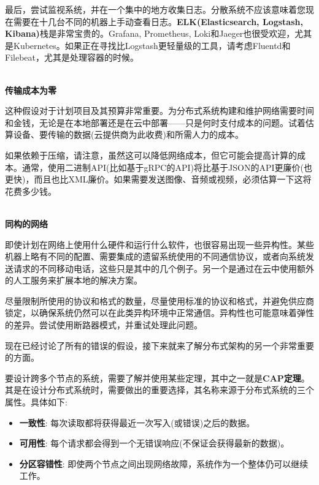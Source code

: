 最后，尝试监视系统，并在一个集中的地方收集日志。分散系统不应该意味着您现在需要在十几台不同的机器上手动查看日志。\textbf{ELK(Elasticsearch, Logstash, Kibana)}栈是非常宝贵的。Grafana, Prometheus, Loki和Jaeger也很受欢迎，尤其是Kubernetes。如果正在寻找比Logstash更轻量级的工具，请考虑Fluentd和Filebeat，尤其是处理容器的时候。

\hspace*{\fill} \\ %
\noindent
\textbf{传输成本为零}

这种假设对于计划项目及其预算非常重要。为分布式系统构建和维护网络需要时间和金钱，无论是在本地部署还是在云中部署——只是何时支付成本的问题。试着估算设备、要传输的数据(云提供商为此收费)和所需人力的成本。

如果依赖于压缩，请注意，虽然这可以降低网络成本，但它可能会提高计算的成本。通常，使用二进制API(比如基于gRPC的API)将比基于JSON的API更廉价(也更快)，而且也比XML廉价。如果需要发送图像、音频或视频，必须估算一下这将花费多少钱。

\hspace*{\fill} \\ %
\noindent
\textbf{同构的网络}

即使计划在网络上使用什么硬件和运行什么软件，也很容易出现一些异构性。某些机器上略有不同的配置、需要集成的遗留系统使用的不同通信协议，或者向系统发送请求的不同移动电话，这些只是其中的几个例子。另一个是通过在云中使用额外的人工服务来扩展本地的解决方案。

尽量限制所使用的协议和格式的数量，尽量使用标准的协议和格式，并避免供应商锁定，以确保系统仍然可以在此类异构环境中正常通信。异构性也可能意味着弹性的差异。尝试使用断路器模式，并重试处理此问题。

现在已经讨论了所有的错误的假设，接下来就来了解分布式架构的另一个非常重要的方面。


要设计跨多个节点的系统，需要了解并使用某些定理，其中之一就是\textbf{CAP定理}。其是在设计分布式系统时，需要做出的重要选择，其名称来源于分布式系统的三个属性。具体如下:

\begin{itemize}
\item 
\textbf{一致性}: 每次读取都将获得最近一次写入(或错误)之后的数据。

\item 
\textbf{可用性}: 每个请求都会得到一个无错误响应(不保证会获得最新的数据)。

\item 
\textbf{分区容错性}: 即使两个节点之间出现网络故障，系统作为一个整体仍可以继续工作。
\end{itemize}

